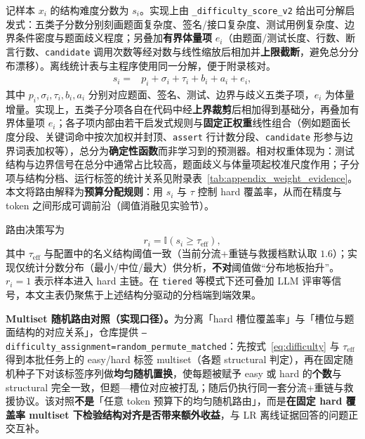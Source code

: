 记样本 $x_i$ 的结构难度分数为 $s_i$。实现上由 \texttt{\_difficulty\_score\_v2} 给出可分解启发式：五类子分数分别刻画题面复杂度、签名/接口复杂度、测试用例复杂度、边界条件密度与题面歧义程度；另叠加\textbf{有界体量项} $e_i$（由题面/测试长度、行数、断言行数、\texttt{candidate} 调用次数等经对数与线性缩放后相加并\textbf{上限截断}，避免总分分布漂移）。离线统计表与主程序使用同一分解，便于附录核对。
\begin{equation}
\label{eq:difficulty}
\begin{aligned}
s_i={}& p_i+\sigma_i+\tau_i+b_i+a_i + e_i,
\end{aligned}
\end{equation}
其中 $p_i,\sigma_i,\tau_i,b_i,a_i$ 分别对应题面、签名、测试、边界与歧义五类子项，$e_i$ 为体量增量。实现上，五类子分项各自在代码中经\textbf{上界裁剪}后相加得到基础分，再叠加有界体量项 $e_i$；各子项内部由若干启发式规则与\textbf{固定正权重}线性组合（例如题面长度分段、关键词命中按次加权并封顶、\texttt{assert} 行计数分段、\texttt{candidate} 形参与边界词表加权等），总分为\textbf{确定性函数}而非学习到的预测器。相对权重体现为：测试结构与边界信号在总分中通常占比较高，题面歧义与体量项起校准尺度作用；子分项与结构分档、运行标签的统计关系见附录表~\ref{tab:appendix_weight_evidence}。本文将路由解释为\textbf{预算分配规则}：用 $s_i$ 与 $\tau$ 控制 hard 覆盖率，从而在精度与 token 之间形成可调前沿（阈值消融见实验节）。

路由决策写为
\begin{equation}
r_i=\mathbb{I}(s_i\ge \tau_{\mathrm{eff}}),
\end{equation}
其中 $\tau_{\mathrm{eff}}$ 与配置中的名义结构阈值一致（当前分流+重链与救援档默认取 $1.6$）；实现仅统计分数分布（最小/中位/最大）供分析，\textbf{不对}阈值做“分布地板抬升”。$r_i=1$ 表示样本进入 hard 主链。在 \texttt{tiered} 等模式下还可叠加 LLM 评审等信号，本文主表仍聚焦于上述结构分驱动的分档端到端效果。

\textbf{Multiset 随机路由对照（实现口径）。}为分离「hard 槽位覆盖率」与「槽位与题面结构的对应关系」，仓库提供 \texttt{--difficulty\_assignment=random\_permute\_matched}：先按式~\eqref{eq:difficulty} 与 $\tau_{\mathrm{eff}}$ 得到本批任务上的 easy/hard 标签 multiset（各题 structural 判定），再在固定随机种子下对该标签序列做\textbf{均匀随机置换}，使每题被赋予 easy 或 hard 的\textbf{个数}与 structural 完全一致，但题—槽位对应被打乱；随后仍执行同一套分流+重链与救援协议。该对照\textbf{不是}「任意 token 预算下的均匀随机路由」，而是\textbf{在固定 hard 覆盖率 multiset 下检验结构对齐是否带来额外收益}，与 LR 离线证据回答的问题正交互补。


